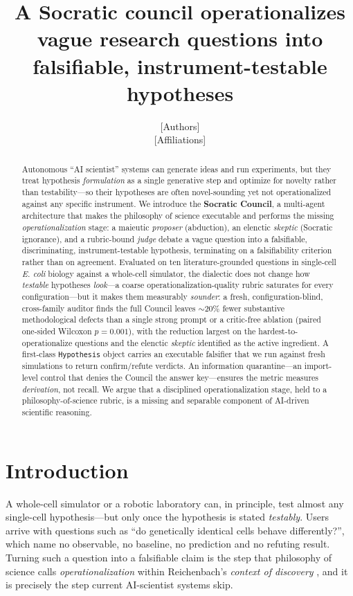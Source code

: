 \documentclass[11pt]{article}
\title{\vspace{-2em}\textbf{A Socratic council operationalizes vague research questions into
falsifiable, instrument-testable hypotheses}}
\author{\normalsize [Authors]\\[-0.3em]\normalsize [Affiliations]}
\date{}
\begin{document}
\maketitle
\vspace{-2em}

\begin{abstract}
\noindent Autonomous ``AI scientist'' systems can generate ideas and run experiments, but they treat hypothesis
\emph{formulation} as a single generative step and optimize for novelty rather than testability---so their
hypotheses are often novel-sounding yet not operationalized against any specific instrument. We introduce the
\textbf{Socratic Council}, a multi-agent architecture that makes the philosophy of science executable and
performs the missing \emph{operationalization} stage: a maieutic \emph{proposer} (abduction), an elenctic
\emph{skeptic} (Socratic ignorance), and a rubric-bound \emph{judge} debate a vague question into a falsifiable,
discriminating, instrument-testable hypothesis, terminating on a falsifiability criterion rather than on
agreement. Evaluated on ten literature-grounded questions in single-cell \emph{E. coli} biology against a
whole-cell simulator, the dialectic does not change how \emph{testable} hypotheses \emph{look}---a coarse
operationalization-quality rubric saturates for every configuration---but it makes them measurably
\emph{sounder}: a fresh, configuration-blind, cross-family auditor finds the full Council leaves
$\sim$20\% fewer substantive methodological defects than a single strong prompt or a critic-free ablation
(paired one-sided Wilcoxon $p=0.001$), with the reduction largest on the hardest-to-operationalize questions and
the elenctic \emph{skeptic} identified as the active ingredient. A first-class \texttt{Hypothesis} object carries
an executable falsifier that we run against fresh simulations to return confirm/refute verdicts. An information
quarantine---an import-level control that denies the Council the answer key---ensures the metric measures
\emph{derivation}, not recall. We argue that a disciplined operationalization stage, held to a
philosophy-of-science rubric, is a missing and separable component of AI-driven scientific reasoning.
\end{abstract}

\section{Introduction}
A whole-cell simulator or a robotic laboratory can, in principle, test almost any single-cell hypothesis---but
only once the hypothesis is stated \emph{testably}. Users arrive with questions such as ``do genetically
identical cells behave differently?'', which name no observable, no baseline, no prediction and no refuting
result. Turning such a question into a falsifiable claim is the step that philosophy of science calls
\emph{operationalization} \citep{bridgman1927logic} within Reichenbach's \emph{context of discovery}
\citep{reichenbach1938experience}, and it is precisely the step current AI-scientist systems skip.
\end{document}
